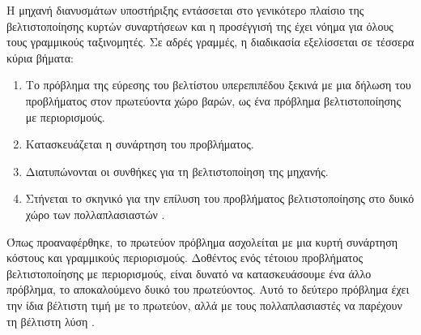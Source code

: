 Η μηχανή διανυσμάτων υποστήριξης εντάσσεται στο γενικότερο πλαίσιο της βελτιστοποίησης κυρτών συναρτήσεων και η προσέγγισή της έχει νόημα για όλους τους γραμμικούς ταξινομητές. Σε αδρές γραμμές, η διαδικασία εξελίσσεται σε τέσσερα κύρια βήματα:
\begin{enumerate}
\item Το πρόβλημα της εύρεσης του βελτίστου υπερεπιπέδου ξεκινά με μια δήλωση του προβλήματος στον πρωτεύοντα χώρο βαρών, ως ένα πρόβλημα βελτιστοποίησης με περιορισμούς.
\item Κατασκευάζεται η συνάρτηση  του προβλήματος.
\item Διατυπώνονται οι συνθήκες για τη βελτιστοποίηση της μηχανής.
\item Στήνεται το σκηνικό για την επίλυση του προβλήματος βελτιστοποίησης στο δυικό χώρο των πολλαπλασιαστών .
\end{enumerate}
\par Όπως προαναφέρθηκε, το πρωτεύον πρόβλημα ασχολείται με μια κυρτή συνάρτηση κόστους και γραμμικούς περιορισμούς. Δοθέντος ενός τέτοιου προβλήματος βελτιστοποίησης με περιορισμούς, είναι δυνατό να κατασκευάσουμε ένα άλλο πρόβλημα, το αποκαλούμενο δυικό του πρωτεύοντος. Αυτό το δεύτερο πρόβλημα έχει την ίδια βέλτιστη τιμή με το πρωτεύον, αλλά με τους πολλαπλασιαστές  να παρέχουν τη βέλτιστη λύση \cite{haykin}.
